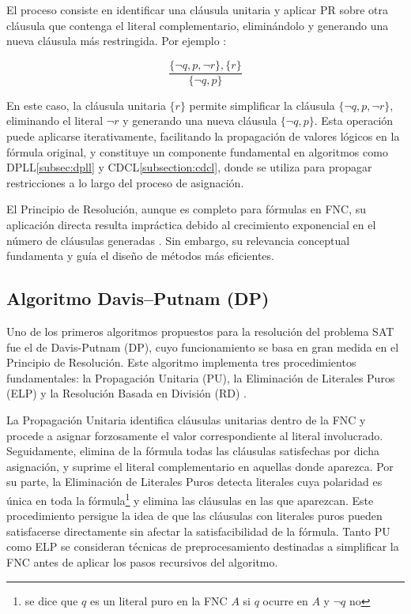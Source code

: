 El proceso consiste en identificar una cl\'ausula unitaria y aplicar PR sobre otra cl\'ausula que contenga el literal complementario, elimin\'andolo y generando una nueva cl\'ausula m\'as restringida. Por ejemplo \cite{garcia-satcap}:

\begin{equation*}
\dfrac{\{\neg q, p, \neg r\},\{r\}}{\{\neg q, p\}}
\end{equation*}

En este caso, la cl\'{a}usula unitaria \( \{r\} \) permite simplificar la cl\'{a}usula \( \{\neg q, p, \neg r\} \), eliminando el literal \( \neg r \) y generando una nueva cl\'{a}usula \( \{\neg q, p\} \). Esta operaci\'{o}n puede aplicarse iterativamente, facilitando la propagaci\'{o}n de valores l\'{o}gicos en la f\'{o}rmula original, y constituye un componente fundamental en algoritmos como DPLL\ref{subsec:dpll} y CDCL\ref{subsection:cdcl}, donde se utiliza para propagar restricciones a lo largo del proceso de asignaci\'{o}n.

El Principio de Resoluci\'on, aunque es completo para fórmulas en FNC, su aplicación directa resulta impráctica debido al crecimiento exponencial en el número de cláusulas generadas \cite{garcia-satcap}. Sin embargo, su relevancia conceptual fundamenta y guía el diseño de métodos más eficientes.


\subsection{Algoritmo Davis–Putnam (DP)}
\label{subsec:davis-putnam}
Uno de los primeros algoritmos propuestos para la resolución del problema SAT fue el de Davis-Putnam (DP), cuyo funcionamiento se basa en gran medida en el Principio de Resolución. Este algoritmo implementa tres procedimientos fundamentales: la Propagación Unitaria (PU), la Eliminación de Literales Puros (ELP) y la Resolución Basada en División (RD) \cite{garcia-satcap}.

La Propagaci\'on Unitaria identifica cláusulas unitarias dentro de la FNC y procede a asignar forzosamente el valor correspondiente al literal involucrado. Seguidamente, elimina de la fórmula todas las cláusulas satisfechas por dicha asignación, y suprime el literal complementario en aquellas donde aparezca. Por su parte, la Eliminaci\'on de Literales Puros detecta literales cuya polaridad es única en toda la fórmula\footnote{se dice que $q$ es un literal puro en la FNC $A$ si $q$ ocurre en $A$ y $\neg q$ no} y elimina las cláusulas en las que aparezcan. Este procedimiento persigue la idea de que las cl\'ausulas con literales puros pueden satisfacerse directamente sin afectar la satisfacibilidad de la fórmula. Tanto PU como ELP se consideran técnicas de preprocesamiento destinadas a simplificar la FNC antes de aplicar los pasos recursivos del algoritmo.

